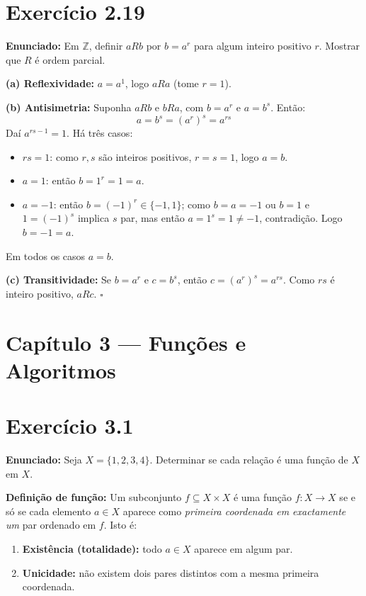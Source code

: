 \documentclass[12pt,a4paper]{article}
\begin{document}
\section*{Exercício 2.19}

\textbf{Enunciado:} Em $\mathbb{Z}$, definir $aRb$ por $b = a^r$ para algum inteiro positivo $r$. Mostrar que $R$ é ordem parcial.

\textbf{(a) Reflexividade:} $a = a^1$, logo $aRa$ (tome $r = 1$).

\textbf{(b) Antisimetria:} Suponha $aRb$ e $bRa$, com $b = a^r$ e $a = b^s$. Então:
\[
a = b^s = (a^r)^s = a^{rs}
\]
Daí $a^{rs-1} = 1$. Há três casos:
\begin{itemize}
  \item $rs = 1$: como $r,s$ são inteiros positivos, $r = s = 1$, logo $a = b$.
  \item $a = 1$: então $b = 1^r = 1 = a$.
  \item $a = -1$: então $b = (-1)^r \in \{-1,1\}$; como $b = a = -1$ ou $b = 1$ e $1 = (-1)^s$ implica $s$ par, mas então $a = 1^s = 1 \neq -1$, contradição. Logo $b = -1 = a$.
\end{itemize}
Em todos os casos $a = b$.

\textbf{(c) Transitividade:} Se $b = a^r$ e $c = b^s$, então $c = (a^r)^s = a^{rs}$. Como $rs$ é inteiro positivo, $aRc$. \hfill$\square$

\newpage

\section*{Capítulo 3 --- Funções e Algoritmos}

\section*{Exercício 3.1}

\textbf{Enunciado:} Seja $X = \{1,2,3,4\}$. Determinar se cada relação é uma função de $X$ em $X$.

\begin{teoribox}
\textbf{Definição de função:} Um subconjunto $f \subseteq X \times X$ é uma função $f: X \to X$ se e só se cada elemento $a \in X$ aparece como \emph{primeira coordenada em exactamente um} par ordenado em $f$. Isto é:
\begin{enumerate}[label=(\roman*)]
  \item \textbf{Existência (totalidade):} todo $a \in X$ aparece em algum par.
  \item \textbf{Unicidade:} não existem dois pares distintos com a mesma primeira coordenada.
\end{enumerate}
\end{teoribox}
\end{document}
